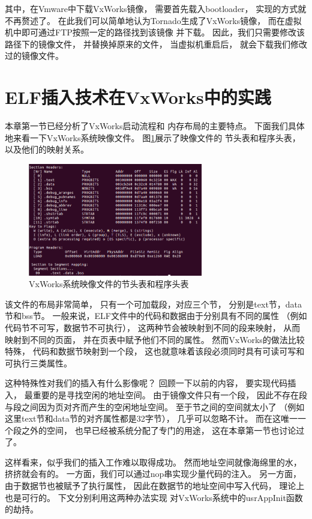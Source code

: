 其中，在Vmware中下载VxWorks镜像，
需要首先载入bootloader，
实现的方式就不再赘述了。
在此我们可以简单地认为Tornado生成了VxWorks镜像，
而在虚拟机中即可通过FTP按照一定的路径找到该镜像
并下载。
因此，我们只需要修改该路径下的镜像文件，
并替换掉原来的文件，
当虚拟机重启后，
就会下载我们修改过的镜像文件。

\section{ELF插入技术在VxWorks中的实践}

本章第一节已经分析了VxWorks启动流程和
内存布局的主要特点。
下面我们具体地来看一下VxWorks系统映像文件。
图\ref{shtandpht}展示了映像文件的
节头表和程序头表，以及他们的映射关系。

\begin{figure}[h!]
    \centering
    \includegraphics[width=0.68\textwidth]{figure/shtandpht.png}
    \caption{VxWorks系统映像文件的节头表和程序头表}
    \label{shtandpht}
\end{figure}

该文件的布局非常简单，
只有一个可加载段，对应三个节，
分别是text节，data节和bss节。
一般来说，ELF文件中的代码和数据由于分别具有不同的属性
（例如代码节不可写，数据节不可执行），
这两种节会被映射到不同的段来映射，
从而映射到不同的页面，
并在页表中赋予他们不同的属性。
然而VxWorks的做法比较特殊，
代码和数据节映射到一个段，
这也就意味着该段必须同时具有可读可写和可执行三类属性。

这种特殊性对我们的插入有什么影像呢？
回顾一下以前的内容，
要实现代码插入，
最重要的是寻找空闲的地址空间。
由于镜像文件只有一个段，
因此不存在段与段之间因为页对齐而产生的空闲地址空间。
至于节之间的空间就太小了
（例如这里text节和data节的对齐属性都是32字节），
几乎可以忽略不计。
而在这唯一一个段之外的空间，
也早已经被系统分配了专门的用途，
这在本章第一节也讨论过了。

这样看来，似乎我们的插入工作难以取得成功。
然而地址空间就像海绵里的水，
挤挤就会有的。
一方面，我们可以通过nop串实现少量代码的注入。
另一方面，由于数据节也被赋予了执行属性，
因此在数据节的地址空间中写入代码，
理论上也是可行的。
下文分别利用这两种办法实现
对VxWorks系统中的usrAppInit函数的劫持。


